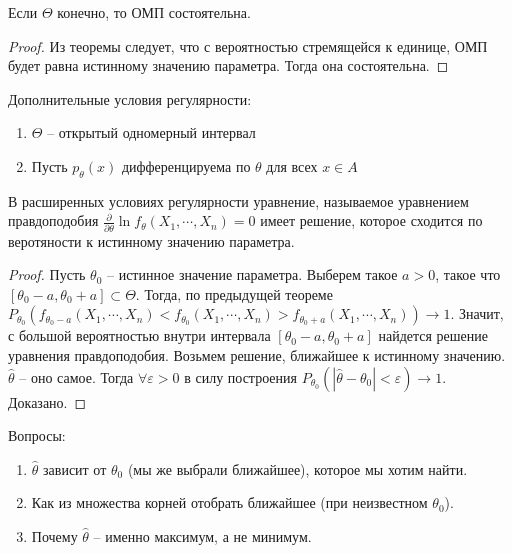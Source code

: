 \documentclass[document.tex]{subfiles}
\begin{document}
\begin{corollary}
    Если $\Theta$ конечно, то ОМП состоятельна.
\end{corollary}

\begin{proof}
    Из теоремы следует, что с вероятностью стремящейся к единице, ОМП будет равна истинному значению параметра. Тогда
    она состоятельна.
\end{proof}

\begin{definition}
    Дополнительные условия регулярности:
    \begin{enumerate}
        \item $\Theta$ -- открытый одномерный интервал
        \item Пусть $p_{\theta}(x)$ дифференцируема по $\theta$ для всех $x \in A$
    \end{enumerate}
\end{definition}

\begin{theorem}
    В расширенных условиях регулярности уравнение, называемое уравнением правдоподобия
    $\frac{\partial}{\partial \theta}\ln f_{\theta}(X_1, \cdots, X_n) = 0$ имеет решение, которое сходится по
    веротяности к истинному значению параметра.
\end{theorem}

\begin{proof}
    Пусть $\theta_0$ -- истинное значение параметра. Выберем такое $a > 0$, такое что $[\theta_0 - a, \theta_0 + a]
    \subset \Theta$. Тогда, по предыдущей теореме $P_{\theta_0}(f_{\theta_0 - a}(X_1, \cdots, X_n) < f_{\theta_0}(X_1,
    \cdots, X_n) > f_{\theta_0 + a}(X_1, \cdots, X_n)) \rightarrow 1$. Значит, с большой вероятностью внутри интервала
    $[\theta_0 - a, \theta_0 + a]$ найдется решение уравнения правдоподобия. Возьмем решение, ближайшее к истинному
    значению. $\hat \theta$ -- оно самое. Тогда $\forall \varepsilon > 0$ в силу построения $P_{\theta_0}(|\hat \theta -
    \theta_0| < \varepsilon) \rightarrow 1$. Доказано.
\end{proof}

Вопросы:
\begin{enumerate}
    \item $\hat \theta$ зависит от $\theta_0$ (мы же выбрали ближайшее), которое мы хотим найти.
    \item Как из множества корней отобрать ближайшее (при неизвестном $\theta_0$).
    \item Почему $\hat \theta$ -- именно максимум, а не минимум.
\end{enumerate}
\end{document}
